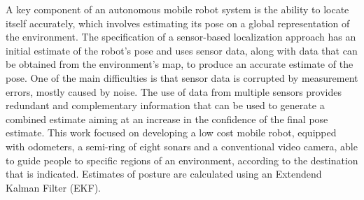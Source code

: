 
A key component of an autonomous mobile robot system is the ability to locate itself accurately, which involves estimating its pose on a global representation of the environment. The specification of a sensor-based localization approach has an initial estimate of the robot's pose and uses sensor data, along with data that can be obtained from the environment's map, to produce an accurate estimate of the pose. One of the main difficulties is that sensor data is corrupted by measurement errors, mostly caused by noise. The use of data from multiple sensors provides redundant and complementary information that can be used to generate a combined estimate aiming at an increase in the confidence of the final pose estimate. This work focused on developing a low cost mobile robot, equipped with odometers, a semi-ring of eight sonars and a conventional video camera, able to guide people to specific regions of an environment, according to the destination that is indicated. Estimates of posture are calculated using an Extendend Kalman Filter (EKF).